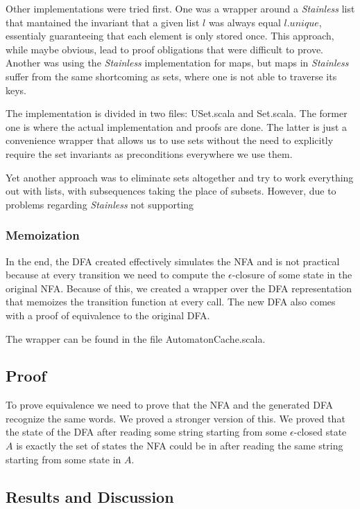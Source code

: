 \documentclass[12pt, a4paper]{article}
\theoremstyle{break}
\begin{document}
Other implementations were tried first. One was a wrapper around a \textit{Stainless}
list that mantained the invariant that a given list $l$ was always equal
$l.unique$, essentialy guaranteeing that each element is only stored once. This
approach, while maybe obvious, lead to proof obligations that were difficult to
prove. Another was using the \textit{Stainless} implementation for maps, but maps in
\textit{Stainless} suffer from the same shortcoming as sets, where one is not able to
traverse its keys.

The implementation is divided in two files: USet.scala and Set.scala. The former
one is where the actual implementation and proofs are done. The latter is just a
convenience wrapper that allows us to use sets without the need to explicitly
require the set invariants as preconditions everywhere we use them.


Yet another approach was to eliminate sets altogether and try to work everything
out with lists, with subsequences taking the place of subsets. However, due to
problems regarding \textit{Stainless} not supporting

\subsubsection{Memoization}

In the end, the DFA created effectively simulates the NFA and is not practical
because at every transition we need to compute the $\epsilon$-closure of some
state in the original NFA. Because of this, we created a wrapper over the DFA
representation that memoizes the transition function at every call. The new DFA
also comes with a proof of equivalence to the original DFA.

The wrapper can be found in the file AutomatonCache.scala.

\subsection{Proof}

To prove equivalence we need to prove that the NFA and the generated DFA
recognize the same words. We proved a stronger version of this. We proved that
the state of the DFA after reading some string starting from some
$\epsilon$-closed state $A$ is exactly the set of states the NFA could be in
after reading the same string starting from some state in $A$.

\subsection{Results and Discussion}
\end{document}
